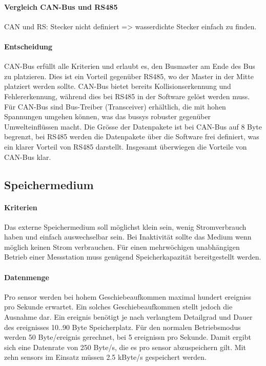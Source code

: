 \paragraph{Vergleich CAN-Bus und RS485}
CAN und RS: Stecker nicht definiert => wasserdichte Stecker einfach zu finden.

\paragraph{Entscheidung}
CAN-Bus erfüllt alle Kriterien und erlaubt es, den Busmaster am Ende des Bus zu platzieren. Dies ist ein Vorteil gegenüber RS485, wo der Master in der Mitte platziert werden sollte. CAN-Bus bietet bereits Kollisionserkennung und Fehlererkennung, während dies bei RS485 in der Software gelöst werden muss. Für CAN-Bus sind Bus-Treiber (Transceiver) erhältlich, die mit hohen Spannungen umgehen können, was das \gls{bussys} robuster gegenüber Umwelteinflüssen macht. Die Grösse der Datenpakete ist bei CAN-Bus auf 8 Byte begrenzt, bei RS485 werden die Datenpakete über die Software frei definiert, was ein klarer Vorteil von RS485 darstellt. Insgesamt überwiegen die Vorteile von CAN-Bus klar. 



\subsection{Speichermedium}
\paragraph{Kriterien} Das externe Speichermedium soll möglichst klein sein, wenig Stromverbrauch haben und einfach auswechselbar sein. Bei Inaktivität sollte das Medium wenn möglich keinen Strom verbrauchen. Für einen mehrwöchigen unabhängigen Betrieb einer Messstation muss genügend Speicherkapazität bereitgestellt werden.

\paragraph{Datenmenge} Pro \gls{sensor} werden bei hohem Geschiebeaufkommen maximal hundert \glspl{ereignis} pro Sekunde erwartet. Ein solches Geschiebeaufkommen stellt jedoch die Ausnahme dar. Ein \gls{ereignis} benötigt je nach verlangtem Detailgrad und Dauer des \gls{ereignis}ses 10..90 Byte Speicherplatz. Für den normalen Betriebsmodus werden 50 Byte/\gls{ereignis} gerechnet, bei 5 \glspl{ereignis}n pro Sekunde. Damit ergibt sich eine Datenrate von 250 Byte/s, die es pro \gls{sensor} abzuspeichern gilt. Mit zehn \glspl{sensor} im Einsatz müssen 2.5 kByte/s gespeichert werden. 

